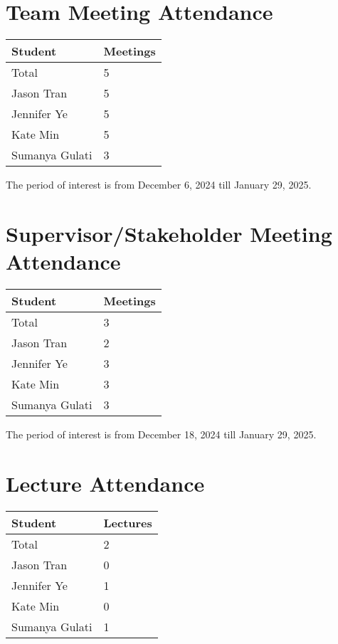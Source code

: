 \documentclass{article}
\begin{document}
\section{Team Meeting Attendance}

\begin{table}[H]
\centering
\begin{tabular}{ll}
\toprule
\textbf{Student} & \textbf{Meetings}\\
\midrule
Total & 5\\
Jason Tran & 5\\
Jennifer Ye & 5\\
Kate Min & 5\\
Sumanya Gulati & 3\\
\bottomrule
\end{tabular}
\end{table}

The period of interest is from December 6, 2024 till January 29, 2025.

\section{Supervisor/Stakeholder Meeting Attendance}

\begin{table}[H]
\centering
\begin{tabular}{ll}
\toprule
\textbf{Student} & \textbf{Meetings}\\
\midrule
Total & 3\\
Jason Tran & 2\\
Jennifer Ye & 3\\
Kate Min & 3\\
Sumanya Gulati & 3\\
\bottomrule
\end{tabular}
\end{table}

The period of interest is from December 18, 2024 till January 29, 2025.

\section{Lecture Attendance}

\begin{table}[H]
\centering
\begin{tabular}{ll}
\toprule
\textbf{Student} & \textbf{Lectures}\\
\midrule
Total & 2\\
Jason Tran & 0\\
Jennifer Ye & 1\\
Kate Min & 0\\
Sumanya Gulati & 1\\
\bottomrule
\end{tabular}
\end{table}
\end{document}
